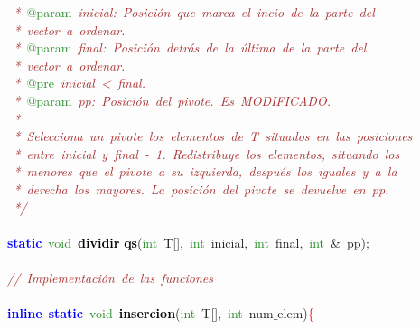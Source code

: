 \mbox{}\textit{\textcolor{Brown}{\ *\ }}\textcolor{ForestGreen}{@param}\textit{\textcolor{Brown}{\ inicial:\ Posición\ que\ marca\ el\ incio\ de\ la\ parte\ del}} \\
\mbox{}\textit{\textcolor{Brown}{\ *\ vector\ a\ ordenar.}} \\
\mbox{}\textit{\textcolor{Brown}{\ *\ }}\textcolor{ForestGreen}{@param}\textit{\textcolor{Brown}{\ final:\ Posición\ detrás\ de\ la\ última\ de\ la\ parte\ del}} \\
\mbox{}\textit{\textcolor{Brown}{\ *\ vector\ a\ ordenar.\ }} \\
\mbox{}\textit{\textcolor{Brown}{\ *\ }}\textcolor{ForestGreen}{@pre}\textit{\textcolor{Brown}{\ inicial\ \textless{}\ final.\ \ }} \\
\mbox{}\textit{\textcolor{Brown}{\ *\ }}\textcolor{ForestGreen}{@param}\textit{\textcolor{Brown}{\ pp:\ Posición\ del\ pivote.\ Es\ MODIFICADO.}} \\
\mbox{}\textit{\textcolor{Brown}{\ *\ }} \\
\mbox{}\textit{\textcolor{Brown}{\ *\ Selecciona\ un\ pivote\ los\ elementos\ de\ T\ situados\ en\ las\ posiciones}} \\
\mbox{}\textit{\textcolor{Brown}{\ *\ entre\ inicial\ y\ final\ -\ 1.\ Redistribuye\ los\ elementos,\ situando\ los}} \\
\mbox{}\textit{\textcolor{Brown}{\ *\ menores\ que\ el\ pivote\ a\ su\ izquierda,\ después\ los\ iguales\ y\ a\ la}} \\
\mbox{}\textit{\textcolor{Brown}{\ *\ derecha\ los\ mayores.\ La\ posición\ del\ pivote\ se\ devuelve\ en\ pp.}} \\
\mbox{}\textit{\textcolor{Brown}{\ */}} \\
\mbox{} \\
\mbox{}\textbf{\textcolor{Blue}{static}}\ \textcolor{ForestGreen}{void}\ \textbf{\textcolor{Black}{dividir$\_$qs}}\textcolor{BrickRed}{(}\textcolor{ForestGreen}{int}\ T\textcolor{BrickRed}{[],}\ \textcolor{ForestGreen}{int}\ inicial\textcolor{BrickRed}{,}\ \textcolor{ForestGreen}{int}\ final\textcolor{BrickRed}{,}\ \textcolor{ForestGreen}{int}\ \textcolor{BrickRed}{\&}\ pp\textcolor{BrickRed}{);} \\
\mbox{} \\
\mbox{}\textit{\textcolor{Brown}{//\ Implementación\ de\ las\ funciones}} \\
\mbox{} \\
\mbox{}\textbf{\textcolor{Blue}{inline}}\ \textbf{\textcolor{Blue}{static}}\ \textcolor{ForestGreen}{void}\ \textbf{\textcolor{Black}{insercion}}\textcolor{BrickRed}{(}\textcolor{ForestGreen}{int}\ T\textcolor{BrickRed}{[],}\ \textcolor{ForestGreen}{int}\ num$\_$elem\textcolor{BrickRed}{)}\textcolor{Red}{\{} \\
